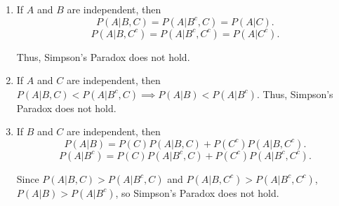 \begin{enumerate}[label=(\alph*)]

\item 
If $A$ and $B$ are independent, then 
$$P(A|B, C) = P(A|B^{c}, C) = P(A|C).$$
$$P(A|B, C^{c}) = P(A|B^{c}, C^{c}) = P(A|C^{c}).$$

Thus, Simpson's Paradox does not hold.

\item
If $A$ and $C$ are independent, then $P(A|B, C) < P(A|B^{c}, C) \implies P(A|B)
< P(A|B^{c}).$ Thus, Simpson's Paradox does not hold.

\item
If $B$ and $C$ are independent, then
$$P(A|B) = P(C)P(A|B, C) + P(C^{c})P(A|B, C^{c}).$$
$$P(A|B^{c}) = P(C)P(A|B^{c}, C) + P(C^{c})P(A|B^{c}, C^{c}).$$

Since $P(A|B, C) > P(A|B^{c}, C)$ and $P(A|B, C^{c}) > P(A|B^{c}, C^{c})$, $P
(A|B) > P(A|B^{c})$, so Simpson's Paradox does not hold.
\end{enumerate}